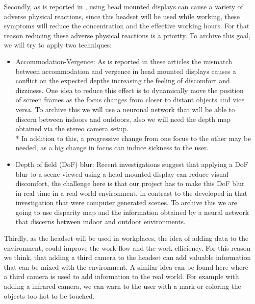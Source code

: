 \documentclass[10pt,a4paper,twocolumn,twoside]{article}
\begin{document}
Secondly, as is reported in \cite{disconfortReview}, using head mounted displays can cause a variety of adverse physical reactions, since this headset will be used while working, these symptoms will reduce the concentration and the effective working hours. For that reason reducing these adverse physical reactions is a priority. To archive this goal, we will try to apply two techniques: 

\begin{itemize}
	\item Accommodation-Vergence: As is reported in these \cite{disconfortReview}\cite{vergenceDisconfort} articles the mismatch between accommodation and vergence in head mounted displays causes a conflict on the expected depths increasing the feeling of discomfort and dizziness.  One idea to reduce this effect is to dynamically move the position of screen frames as the focus changes from closer to distant objects and vice versa. To archive this we will use a neuronal network that will be able to discern between indoors and outdoors, also we will need the depth map obtained via the stereo camera setup. \\*
	In addition to this, a progressive change from one focus to the other may be needed, as a big change in focus can induce sickness to the user.
	
	\item Depth of field (DoF) blur: Recent investigations\cite{ifftConfortDoF} suggest that applying a DoF blur to a scene viewed using a head-mounted display can reduce visual discomfort, the challenge here is that our project has to make this DoF blur in real time in a real world environment, in contrast to the developed in that investigation that were computer generated scenes. To archive this we are going to use disparity map and the information obtained by a neural network that discerns between indoor and outdoor environments.
\end{itemize} 

Thirdly, as the headset will be used in workplaces, the idea of adding data to the environment, could improve the work-flow and the work efficiency. For this reason we think, that adding a third camera to the headset can add valuable information that can be mixed with the environment. A similar idea can be found here \cite{vismerge} where a third camera is used to add information to the real world. For example with adding a infrared camera, we can warn to the user with a mark or coloring the objects too hot to be touched.
\end{document}
